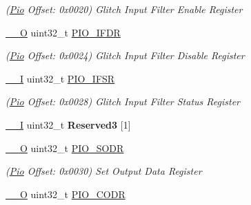 \begin{DoxyCompactItemize}
\begin{DoxyCompactList}\small\item\em (\mbox{\hyperlink{structPio}{Pio}} Offset\+: 0x0020) Glitch Input Filter Enable Register \end{DoxyCompactList}\item 
\mbox{\label{structPio_a46cd25b513fb60a1205a0cc52477ec7a}} 
\mbox{\hyperlink{core__cm7_8h_a7e25d9380f9ef903923964322e71f2f6}{\+\_\+\+\_\+O}} uint32\+\_\+t \mbox{\hyperlink{structPio_a46cd25b513fb60a1205a0cc52477ec7a}{P\+I\+O\+\_\+\+I\+F\+DR}}
\begin{DoxyCompactList}\small\item\em (\mbox{\hyperlink{structPio}{Pio}} Offset\+: 0x0024) Glitch Input Filter Disable Register \end{DoxyCompactList}\item 
\mbox{\label{structPio_ab79709d9e4f15eea18a20e4726f80d00}} 
\mbox{\hyperlink{core__cm7_8h_af63697ed9952cc71e1225efe205f6cd3}{\+\_\+\+\_\+I}} uint32\+\_\+t \mbox{\hyperlink{structPio_ab79709d9e4f15eea18a20e4726f80d00}{P\+I\+O\+\_\+\+I\+F\+SR}}
\begin{DoxyCompactList}\small\item\em (\mbox{\hyperlink{structPio}{Pio}} Offset\+: 0x0028) Glitch Input Filter Status Register \end{DoxyCompactList}\item 
\mbox{\label{structPio_a1cb07737f1df104c01cc4c6d23f6cb58}} 
\mbox{\hyperlink{core__cm7_8h_af63697ed9952cc71e1225efe205f6cd3}{\+\_\+\+\_\+I}} uint32\+\_\+t {\bfseries Reserved3} \mbox{[}1\mbox{]}
\item 
\mbox{\label{structPio_aff7c1c306d049c5c8788f861d3213d7d}} 
\mbox{\hyperlink{core__cm7_8h_a7e25d9380f9ef903923964322e71f2f6}{\+\_\+\+\_\+O}} uint32\+\_\+t \mbox{\hyperlink{structPio_aff7c1c306d049c5c8788f861d3213d7d}{P\+I\+O\+\_\+\+S\+O\+DR}}
\begin{DoxyCompactList}\small\item\em (\mbox{\hyperlink{structPio}{Pio}} Offset\+: 0x0030) Set Output Data Register \end{DoxyCompactList}\item 
\mbox{\label{structPio_a7695904ac144e94f30f91e628a3c0988}} 
\mbox{\hyperlink{core__cm7_8h_a7e25d9380f9ef903923964322e71f2f6}{\+\_\+\+\_\+O}} uint32\+\_\+t \mbox{\hyperlink{structPio_a7695904ac144e94f30f91e628a3c0988}{P\+I\+O\+\_\+\+C\+O\+DR}}

\end{DoxyCompactItemize}
